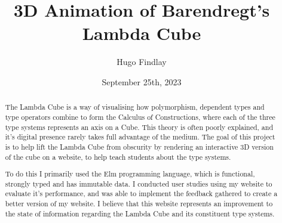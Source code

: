 \documentclass{l4proj}
\begin{document}
\title{3D Animation of Barendregt's Lambda Cube}
\author{Hugo Findlay}
\date{September 25th, 2023}

\maketitle

\begin{abstract}
    The Lambda Cube is a way of visualising how polymorphism, dependent types and type operators combine to form the Calculus of Constructions, where each of the three type systems represents an axis on a Cube.  This theory is often poorly explained, and it's digital presence rarely takes full advantage of the medium.  The goal of this project is to help lift the Lambda Cube from obscurity by rendering an interactive 3D version of the cube on a website, to help teach students about the type systems.

    To do this I primarily used the Elm programming language, which is functional, strongly typed and has immutable data.  I conducted user studies using my website to evaluate it's performance, and was able to implement the feedback gathered to create a better version of my website.  I believe that this website represents an improvement to the state of information regarding the Lambda Cube and its constituent type systems.
    
\end{abstract}


%
%
\def\consentname {Hugo Findlay} %
\def\consentdate {14 February 2024} %
%
\educationalconsent


\tableofcontents
\end{document}
